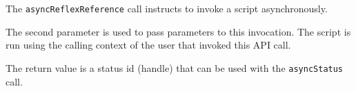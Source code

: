 The \verb+asyncReflexReference+ call instructs \Rapture to invoke a \Reflex script asynchronously.

The second parameter is used to pass parameters to this invocation. The script is run using the calling context
of the user that invoked this API call.

The return value is a status id (handle) that can be used with the \verb+asyncStatus+ call.
